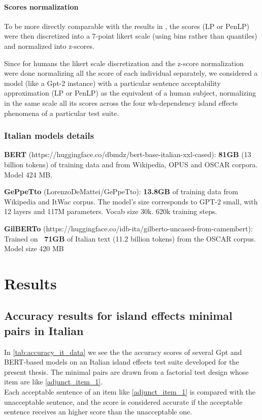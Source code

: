 \subsubsection{Scores normalization}

To be more directly comparable with the results in \citet{sprouse2016experimental}, the scores (LP or PenLP) were then discretized into a 7-point likert scale (using bins rather than quantiles) and normalized into z-scores.

Since for humans the likert scale discretization and the z-score normalization were done normalizing all the score of each individual separately, we considered a model (like a Gpt-2 instance) with a particular sentence acceptability approximation (LP or PenLP) as the equivalent of a human subject, normalizing in the same scale all its scores across the four wh-dependency island effects phenomena of a particular test suite.


\subsection{Italian models details}

\textbf{BERT} (https://huggingface.co/dbmdz/bert-base-italian-xxl-cased): \textbf{81GB} (13 billion tokens) of training data  and from Wikipedia, OPUS and OSCAR corpora. Model 
424 MB.

\textbf{GePpeTto} (LorenzoDeMattei/GePpeTto): \textbf{13.8GB} of training data from Wikipedia and ItWac corpus. The model’s size corresponds to GPT-2 small, with 12 layers and 117M parameters. Vocab size 30k. 620k training steps.

\textbf{GilBERTo} (https://huggingface.co/idb-ita/gilberto-uncased-from-camembert): Trained on \textbf{~71GB} of Italian text (11.2 billion tokens) from the OSCAR corpus. Model size 420 MB



\chapter{Results}

\section{Accuracy results for island effects minimal pairs in Italian}

In \autoref{tab:accuracy_it_data} we see the the accuracy scores of several Gpt and BERT-based models on an Italian island effects test suite developed for the present thesis. The minimal pairs are drawn from a factorial test design whose item are like \autoref{adjunct_item_1}. 
\\ Each acceptable sentence of an item like \autoref{adjunct_item_1} is compared with the unacceptable sentence, and the score is considered accurate if the acceptable sentence receives an higher score than the unacceptable one.

